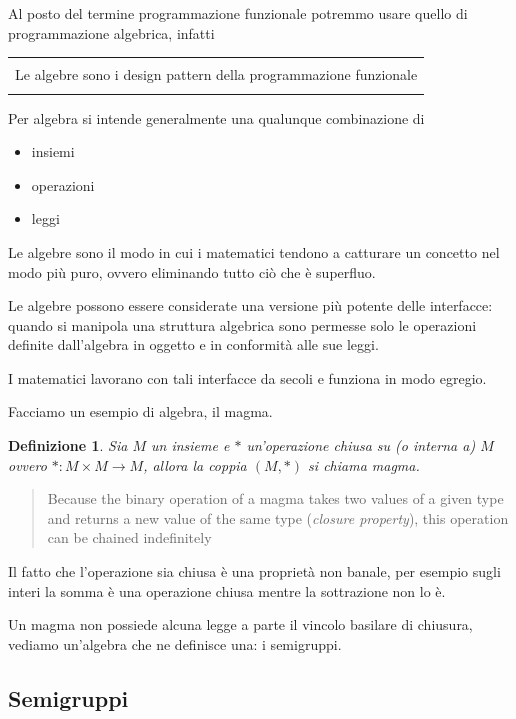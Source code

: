 \documentclass[12pt]{article}
\newtheorem{definition}{Definizione}
\newenvironment{boxed}
    {\begin{center}
    \begin{tabular}{|p{0.9\textwidth}|}
    \hline\\
    }
    {
    \\\\\hline
    \end{tabular}
    \end{center}
    }
\begin{document}
Al posto del termine programmazione funzionale potremmo usare quello di programmazione algebrica, infatti

\begin{boxed}
Le algebre sono i design pattern della programmazione funzionale
\end{boxed}

Per algebra si intende generalmente una qualunque combinazione di

\begin{itemize}
  \item insiemi
  \item operazioni
  \item leggi
\end{itemize}

Le algebre sono il modo in cui i matematici tendono a catturare un concetto nel modo più puro,
ovvero eliminando tutto ciò che è superfluo.

Le algebre possono essere considerate una versione più potente delle interfacce: quando si manipola una struttura algebrica
sono permesse solo le operazioni definite dall'algebra in oggetto e in conformità alle sue leggi.

I matematici lavorano con tali interfacce da secoli e funziona in modo egregio.

Facciamo un esempio di algebra, il magma.

\begin{definition}
Sia $M$ un insieme e $*$ un'operazione \emph{chiusa su} (o \emph{interna a}) $M$ ovvero $*: M \times M \rightarrow M$,
allora la coppia $(M, *)$ si chiama \emph{magma}.
\end{definition}

\begin{quote}
Because the binary operation of a magma takes two values of a given type and returns a new value of the same type (\emph{closure property}),
this operation can be chained indefinitely
\end{quote}

Il fatto che l'operazione sia chiusa è una proprietà non banale,
per esempio sugli interi la somma è una operazione chiusa mentre la sottrazione non lo è.

Un magma non possiede alcuna legge a parte il vincolo basilare di chiusura, vediamo un'algebra che ne definisce una: i semigruppi.

\subsection{Semigruppi}
\end{document}
